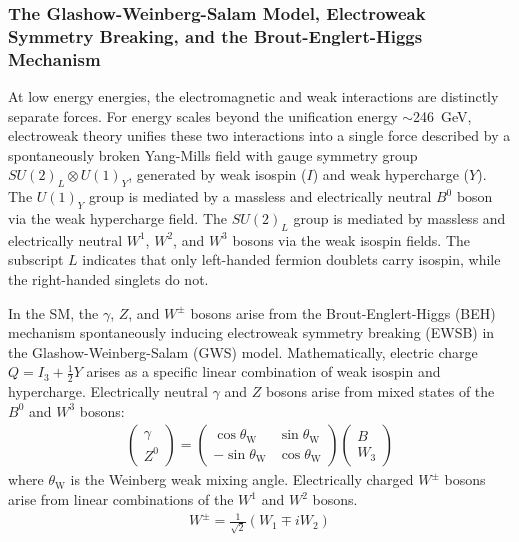 \subsubsection{The Glashow-Weinberg-Salam Model, Electroweak Symmetry Breaking, and the Brout-Englert-Higgs Mechanism}
At low energy energies, the electromagnetic and weak interactions are distinctly separate forces.
For energy scales beyond the unification energy $\sim$\SI{246}{\GeV}, electroweak theory unifies these two interactions into a single force described by a spontaneously broken Yang-Mills field with gauge symmetry group $SU(2)_L \otimes U(1)_Y$, generated by weak isospin ($I$) and weak hypercharge ($Y$).
The $U(1)_Y$ group is mediated by a massless and electrically neutral $B^0$ boson via the weak hypercharge field.
The $SU(2)_L$ group is mediated by massless and electrically neutral $W^1$, $W^2$, and $W^3$ bosons via the weak isospin fields.
The subscript $L$ indicates that only left-handed fermion doublets carry isospin, while the right-handed singlets do not.

In the SM, the $\gamma$, $Z$, and $W^\pm$ bosons arise from the Brout-Englert-Higgs (BEH) mechanism spontaneously inducing electroweak symmetry breaking (EWSB) in the Glashow-Weinberg-Salam (GWS) model.
Mathematically, electric charge $Q = I_3 + \frac{1}{2} Y$ arises as a specific linear combination of weak isospin and hypercharge.
Electrically neutral $\gamma$ and $Z$ bosons arise from mixed states of the $B^0$ and $W^3$ bosons:
\begin{eqnarray}
\left(\begin{array}{c}
\gamma \\
Z^0
\end{array}\right)=\left(\begin{array}{cc}
\cos \theta_{\mathrm{W}} & \sin \theta_{\mathrm{W}} \\
-\sin \theta_{\mathrm{W}} & \cos \theta_{\mathrm{W}}
\end{array}\right)\left(\begin{array}{c}
B \\
W_3
\end{array}\right)
\label{}
\end{eqnarray}
where $\theta_{\mathrm{W}}$ is the Weinberg weak mixing angle.
Electrically charged $W^\pm$ bosons arise from linear combinations of the $W^1$ and $W^2$ bosons.
\begin{eqnarray}
W^{\pm}=\frac{1}{\sqrt{2}}\left(W_1 \mp i W_2\right)
\label{}
\end{eqnarray}


